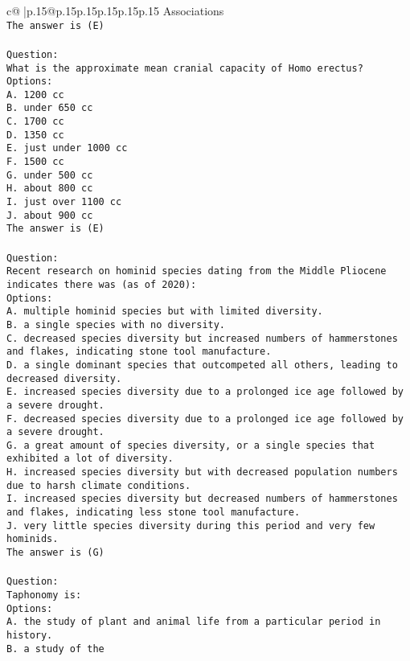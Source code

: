 \documentclass{article}
\begin{document}
{\begin{supertabular}{c@{$\;$}|p{.15\linewidth}@{}p{.15\linewidth}p{.15\linewidth}p{.15\linewidth}p{.15\linewidth}p{.15\linewidth}}
{{{Associations\\ \tt The answer is (E)\\ \tt \\ \tt Question:\\ \tt What is the approximate mean cranial capacity of Homo erectus?\\ \tt Options:\\ \tt A. 1200 cc\\ \tt B. under 650 cc\\ \tt C. 1700 cc\\ \tt D. 1350 cc\\ \tt E. just under 1000 cc\\ \tt F. 1500 cc\\ \tt G. under 500 cc\\ \tt H. about 800 cc\\ \tt I. just over 1100 cc\\ \tt J. about 900 cc\\ \tt The answer is (E)\\ \tt \\ \tt Question:\\ \tt Recent research on hominid species dating from the Middle Pliocene indicates there was (as of 2020):\\ \tt Options:\\ \tt A. multiple hominid species but with limited diversity.\\ \tt B. a single species with no diversity.\\ \tt C. decreased species diversity but increased numbers of hammerstones and flakes, indicating stone tool manufacture.\\ \tt D. a single dominant species that outcompeted all others, leading to decreased diversity.\\ \tt E. increased species diversity due to a prolonged ice age followed by a severe drought.\\ \tt F. decreased species diversity due to a prolonged ice age followed by a severe drought.\\ \tt G. a great amount of species diversity, or a single species that exhibited a lot of diversity.\\ \tt H. increased species diversity but with decreased population numbers due to harsh climate conditions.\\ \tt I. increased species diversity but decreased numbers of hammerstones and flakes, indicating less stone tool manufacture.\\ \tt J. very little species diversity during this period and very few hominids.\\ \tt The answer is (G)\\ \tt \\ \tt Question:\\ \tt Taphonomy is:\\ \tt Options:\\ \tt A. the study of plant and animal life from a particular period in history.\\ \tt B. a study of the }}}
\end{supertabular}}
\end{document}
